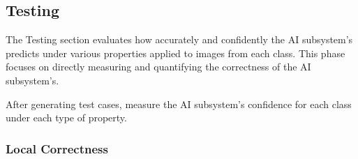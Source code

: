 \documentclass[10pt, conference, a4paper, final]{IEEEtran}
\begin{document}





\subsection{Testing }

The Testing section evaluates how accurately and confidently the  AI subsystem's predicts under various properties applied to images from each class. This phase focuses on directly measuring and quantifying the correctness of the  AI subsystem's.

 After generating test cases, measure the  AI subsystem's confidence for each class under each type of property.
     

  
    \subsubsection{Local Correctness}
\end{document}
